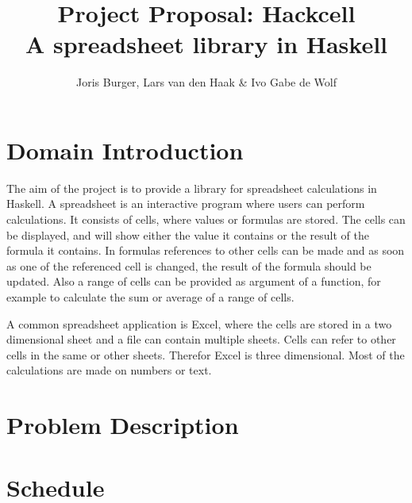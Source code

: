 \documentclass{article}
\title{
	\vskip -3cm
	Project Proposal: Hackcell \\
	\vskip 0.5cm
	\large{A spreadsheet library in Haskell}
}
\author{Joris Burger, Lars van den Haak \& Ivo Gabe de Wolf}
\begin{document}
	\maketitle
	\section{Domain Introduction}
	The aim of the project is to provide a library for spreadsheet calculations in Haskell. A spreadsheet is an interactive program where users can perform calculations. It consists of cells, where values or formulas are stored. The cells can be displayed, and will show either the value it contains or the result of the formula it contains. In formulas references to other cells can be made and as soon as one of the referenced cell is changed, the result of the formula should be updated. Also a range of cells can be provided as argument of a function, for example to calculate the sum or average of a range of cells. 
	
	A common spreadsheet application is Excel, where the cells are stored in a two dimensional sheet and a file can contain multiple sheets. Cells can refer to other cells in the same or other sheets. Therefor Excel is three dimensional. Most of the calculations are made on numbers or text. 
	
	\section{Problem Description}
	
	\section{Schedule}
\end{document}
